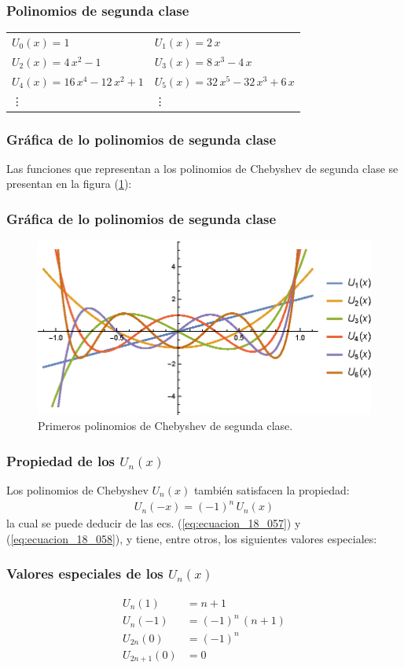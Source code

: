 \documentclass[12pt]{beamer}
\begin{document}
\begin{frame}
\frametitle{Polinomios de segunda clase}
\begin{table}[H]
\centering
\fontsize{14}{14}\selectfont
\begin{tabular}{p{4.8cm} p{5cm}}
$U_{0} (x) {=} 1$ & $U_{1} (x) {=} 2 \, x$ \\[0.5em]
$U_{2} (x) {=} 4 \, x^{2} {-} 1$ & $U_{3} (x) {=} 8 \, x^{3} {-} 4 \, x$ \\[0.5em]
$U_{4} (x) {=} 16 \, x^{4} {-} 12 \, x^{2} {+} 1$ & $U_{5} (x) {=} 32 \, x^{5} {-} 32 \, x^{3} {+} 6 \, x$ \\
\vdots & \vdots
\end{tabular}
\end{table}
\end{frame}
\begin{frame}
\frametitle{Gráfica de lo polinomios de segunda clase}
Las funciones que representan a los polinomios de Chebyshev de segunda clase se presentan en la figura (\ref{fig:figura_plot_chebychev_02}):
\end{frame}
\begin{frame}
\frametitle{Gráfica de lo polinomios de segunda clase}
\begin{figure}[H]
    \centering
    \includegraphics[scale=0.95]{Imagenes/Plot_Polinomios_Chebychev_02.eps}
    \caption{Primeros polinomios de Chebyshev de segunda clase.}
    \label{fig:figura_plot_chebychev_02}
\end{figure}
\end{frame}
\begin{frame}
\frametitle{Propiedad de los $U_{n} (x)$}
Los polinomios de Chebyshev $U_{n} (x)$ también satisfacen la propiedad:
\pause
\begin{align*}
U_{n} (-x) = (-1)^{n} \, U_{n} (x)
\end{align*}
la cual se puede deducir de las ecs. (\ref{eq:ecuacion_18_057}) y (\ref{eq:ecuacion_18_058}), y tiene, entre otros, los siguientes valores especiales:
\end{frame}
\begin{frame}
\frametitle{Valores especiales de los $U_{n} (x)$}
\begin{align*}
U_{n} (1) &= n + 1 \\[0.5em]
U_{n} (-1) &= (-1)^{n} \, (n + 1) \\[0.5em]
U_{2n} (0) &= (-1)^{n} \\[0.5em]
U_{2n+1} (0) &= 0
\end{align*}
\end{frame}
\end{document}
